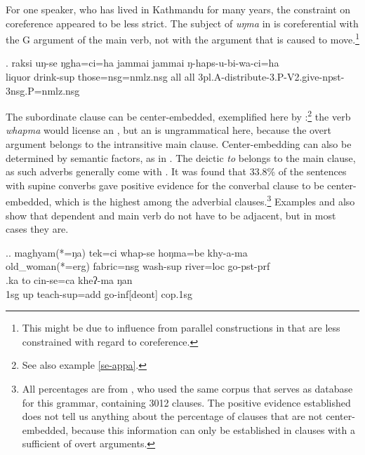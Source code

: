 For one speaker, who has lived  in Kathmandu for many years, the constraint on coreference appeared to be less strict. The subject of \emph{uŋma}  in \Next is coreferential with the G argument of the main verb, not with the argument that is caused to move.\footnote{This might be due to influence from parallel constructions in  that are less constrained with regard to coreference.}

		\exg.		raksi  uŋ-se          ŋgha=ci=ha            jammai jammai ŋ-haps-u-bi-wa-ci=ha\\
	liquor   drink{\sc -sup} those{\sc =nsg=nmlz.nsg} all all {\sc 3pl.A-}distribute{\sc -3.P-V2.give-npst-3nsg.P=nmlz.nsg}\\
		
The subordinate clause can be center-embedded, exemplified here by \Next[a]:\footnote{See also example \ref{se-appa}.} the verb \emph{whapma} would license an , but an  is ungrammatical here, because the overt argument belongs to the intransitive main clause. Center-embedding can also be determined by semantic factors, as in \Next[b]. The deictic  \emph{to} belongs to the main clause, as such adverbs generally come with . It was found that 33.8\% of the sentences with supine converbs gave positive evidence for the converbal clause to be center-embedded, which is the highest  among the adverbial clauses.\footnote{All percentages are from \citep{Bierkandtetal_Scope}, who used the same corpus that serves as database for this grammar, containing 3012 clauses. The positive evidence established does not tell us anything about the percentage of clauses that are not center-embedded, because this information can only be established in clauses with a sufficient  of overt arguments.} Examples  \Last and  \Next also show that dependent and main verb do not have to be adjacent, but in most cases they are.
 		
\ex.\ag. maghyam(*=ŋa)   tek=ci        whap-se                hoŋma=be    khy-a-ma\\
old\_woman(*=erg) fabric{\sc =nsg} wash{\sc -sup} river{\sc =loc} go{\sc [3sg]-pst-prf}\\
\bg.ka  to  cin-se=ca    kheʔ-ma   ŋan\\
{\sc 1sg} up teach{\sc -sup=add} go{\sc -inf[deont]} {\sc cop.1sg}\\
		
